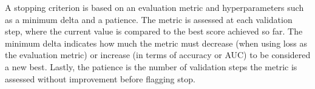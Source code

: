         A stopping criterion is based on an evaluation metric and hyperparameters such as a minimum delta and a patience. The metric is assessed at each validation step, where the current value is compared to the best score achieved so far. The minimum delta indicates how much the metric must decrease (when using loss as the evaluation metric) or increase (in terms of accuracy or AUC) to be considered a new best. Lastly, the patience is the number of validation steps the metric is assessed without improvement before flagging stop.

